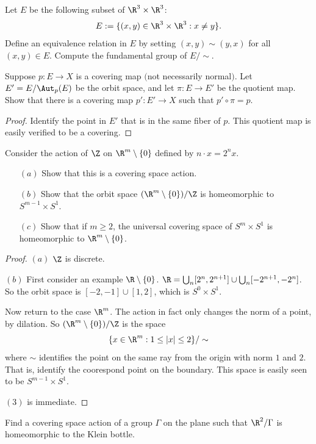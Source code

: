 \begin{exercise}
Let $E$ be the following subset of $\R^3\times\R^3$:
\[E:=\{(x,y)\in\R^3\times\R^3:x\neq y\}.\]
Define an equivalence relation in $E$ by setting $(x,y)\sim(y,x)$ for all $(x,y)\in E$. Compute the fundamental group of $E/\sim$.
\end{exercise}
\begin{exercise}
Suppose $p:E\to X$ is a covering map $($not necessarily normal$)$. Let $E'=E/\Aut_p(E)$ be the orbit space, and let $\pi:E\to E'$ be the quotient map. Show that there is a covering map $p':E'\to X$ such that $p'\circ\pi=p$.
\end{exercise}
\begin{proof}
Identify the point in $E'$ that is in the same fiber of $p$. This quotient map is easily verified to be a covering.
\end{proof}
\begin{exercise}
Consider the action of $\Z$ on $\R^m\setminus\{0\}$ defined by $n\cdot x=2^nx$.
\begin{itemize}
\item[$(a)$]Show that this is a covering space action.
\item[$(b)$]Show that the orbit space $(\R^m\setminus\{0\})/\Z$ is homeomorphic to $S^{m-1}\times S^1$.
\item[$(c)$]Show that if $m\geq2$, the universal covering space of $S^m\times S^1$ is homeomorphic to $\R^m\setminus\{0\}$.
\end{itemize}
\end{exercise}
\begin{proof}
$(a)$ $\Z$ is discrete.\par
$(b)$ First consider an example $\R\setminus\{0\}$. $\R=\bigcup_n[2^n,2^{n+1}]\cup\bigcup_n[-2^{n+1},-2^n]$. So the orbit space is $[-2,-1]\cup[1,2]$, which is $S^0\times S^1$.\par
Now return to the case $\R^m$. The action in fact only changes the norm of a point, by dilation. So $(\R^m\setminus\{0\})/\Z$ is the space
\[\{x\in\R^m:1\leq|x|\leq 2\}/\sim\]
where $\sim$ identifies the point on the same ray from the origin with norm $1$ and $2$. That is, identify the coorespond point on the boundary. This space is easily seen to be $S^{m-1}\times S^1$.\par
$(3)$ is immediate.
\end{proof}
\begin{exercise}
Find a covering space action of a group $\Gamma$ on the plane such that $\R^2/\Gamma$ is homeomorphic to the Klein bottle.
\end{exercise}
